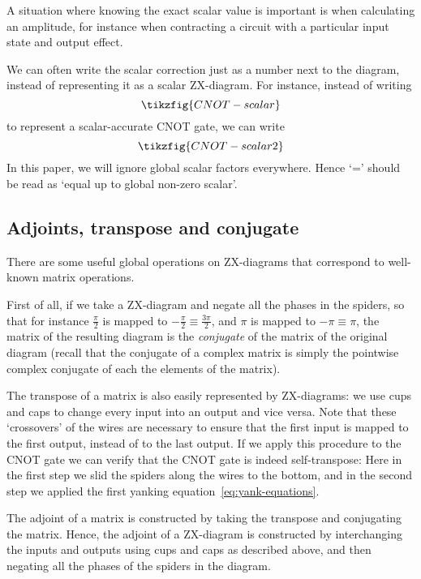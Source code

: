 \documentclass[a4paper,onecolumn,superscriptaddress,11pt,%
				unpublished,%
				allowfontchageintitle,%
				]{quantumarticle}
\begin{document}
A situation where knowing the exact scalar value is important is when calculating an amplitude, for instance when contracting a circuit with a particular input state and output effect.

We can often write the scalar correction just as a number next to the diagram, instead of representing it as a scalar ZX-diagram. For instance, instead of writing
\begin{equation}
\tikzfig{CNOT-scalar}
\end{equation}
to represent a scalar-accurate CNOT gate, we can write
\begin{equation}
\tikzfig{CNOT-scalar2}
\end{equation}
In this paper, we will ignore global scalar factors everywhere. Hence `=' should be read as `equal up to global non-zero scalar'.


\subsection{Adjoints, transpose and conjugate}

There are some useful global operations on ZX-diagrams that correspond to well-known matrix operations.

First of all, if we take a ZX-diagram and negate all the phases in the spiders, so that for instance $\frac{\pi}{2}$ is mapped to $-\frac{\pi}{2} \equiv \frac{3\pi}{2}$, and $\pi$ is mapped to $-\pi\equiv \pi$, the matrix of the resulting diagram is the \emph{conjugate} of the matrix of the original diagram (recall that the conjugate of a complex matrix is simply the pointwise complex conjugate of each the elements of the matrix).

The transpose of a matrix is also easily represented by ZX-diagrams: we use cups and caps to change every input into an output and vice versa.
Note that these `crossovers' of the wires are necessary to ensure that the first input is mapped to the first output, instead of to the last output. If we apply this procedure to the CNOT gate we can verify that the CNOT gate is indeed self-transpose:
Here in the first step we slid the spiders along the wires to the bottom, and in the second step we applied the first yanking equation~\eqref{eq:yank-equations}.


The adjoint of a matrix is constructed by taking the transpose and conjugating the matrix. Hence, the adjoint of a ZX-diagram is constructed by interchanging the inputs and outputs using cups and caps as described above, and then negating all the phases of the spiders in the diagram.
\end{document}
